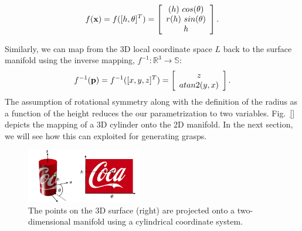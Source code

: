 \documentclass{aamas2015}
\begin{document}
		
\begin{equation}
	f(\textbf{x}) = f([h, \theta]^T) = \left[ 
	\begin{array}{c}
	(h) ~ cos(\theta) \\ r(h) ~ sin(\theta)\\ h 
	\end{array} \right]. 
\end{equation}
		
Similarly, we can map from the 3D local coordinate space $L$ back to the 
surface manifold using the inverse mapping, $f^{-1}: \mathbb{R}^3 \rightarrow \mathbb{S}$:
\begin{equation}
	f^{-1}(\textbf{p}) = f^{-1}([x,y,z]^T) = \left[ \begin{array}{c} z \\ atan2(y,x) \end{array}\right].
\end{equation}
The assumption of rotational symmetry along with the definition of the radius as a function of the height reduces the our parametrization to two variables. Fig.~\ref{} depicts the mapping of a 3D cylinder onto the 2D manifold. In the next section, we will see how this can exploited for generating grasps.

\begin{figure}[h!]
  \begin{center}
    \includegraphics[width=0.45\textwidth]{./images/unfolding.pdf} \quad
  \end{center}
  \caption{The points on the 3D surface (right) are projected onto a two-dimensional manifold using a cylindrical coordinate system.\label{fig:unfolding}}
\end{figure}
\end{document}
